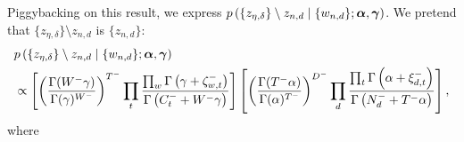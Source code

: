 Piggybacking on this result, we express $p\left(\{z_{\eta, \delta}\} \setminus z_{n, d} \mid \{w_{n, d}\}; \boldsymbol{\mathbf{\alpha}}, \boldsymbol{\mathbf{\gamma}}\right)$. We pretend that $\{z_{\eta, \delta}\} \setminus z_{n, d}$ is $\{z_{n, d}\}$:
\begin{align}
    &p\left(\{z_{\eta, \delta}\} \setminus z_{n, d} \mid \{w_{n, d}\}; \boldsymbol{\mathbf{\alpha}}, \boldsymbol{\mathbf{\gamma}}\right) \nonumber\\
    &\propto
        \left[
            \left(
                \frac
                {
                    \Gamma({W^-} \gamma)
                }
                {
                    \Gamma(\gamma)^{W^-}
                }
            \right)^{T^-}
            \prod_t
                \frac
                {
                    \prod_w \Gamma\left(\gamma + \zeta_{w, t}^-\right)
                }
                {
                    \Gamma\left(C_t^- + {W^-}\gamma\right)
                }
        \right]
        \left[
            \left(
                \frac
                {
                    \Gamma({T^-} \alpha)
                }
                {
                    \Gamma(\alpha)^{T^-}
                }
            \right)^{D^-}
            \prod_d
                \frac
                {
                    \prod_t \Gamma\left(\alpha + \xi_{d, t}^-\right)
                }
                {
                    \Gamma\left(N_d^- + {T^-} \alpha\right)
                }
        \right],
\end{align}
where
